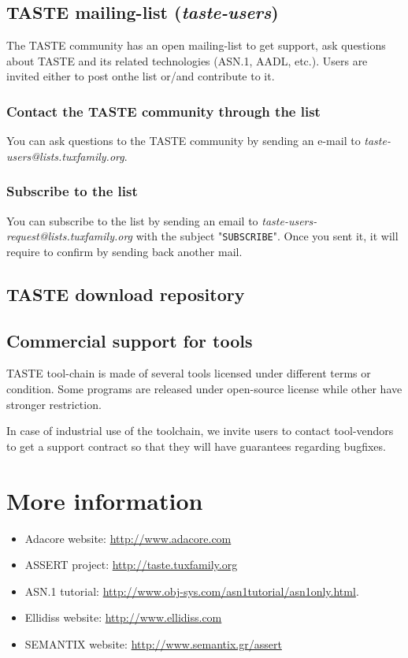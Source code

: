 \documentclass[11pt]{book}
\begin{document}
{   \section{TASTE mailing-list (\textit{taste-users})}
   The TASTE community has an open mailing-list to get support, ask questions
   about TASTE and its related technologies (ASN.1, AADL, etc.). Users are
   invited either to post onthe list or/and contribute to it.

      \subsection{Contact the TASTE community through the list}
      You can ask questions to the TASTE community by sending an e-mail to
      \textit{taste-users@lists.tuxfamily.org}.

      \subsection{Subscribe to the list}
      You can subscribe to the list by sending an email to
      \textit{taste-users-request@lists.tuxfamily.org} with the subject
      "\texttt{SUBSCRIBE}". Once you sent it, it will require to confirm by
      sending back another mail.

   \section{TASTE download repository}

   \section{Commercial support for tools}
   TASTE tool-chain is made of several tools licensed under different terms or
   condition. Some programs are released under open-source license while other
   have stronger restriction.

   In case of industrial use of the toolchain, we invite users to contact
   tool-vendors to get a support contract so that they will have guarantees
   regarding bugfixes.

\appendix

\chapter{More information}
\begin{itemize}
   \item
      Adacore website: \url{http://www.adacore.com}
   \item
      ASSERT project: \url{http://taste.tuxfamily.org}
   \item
      ASN.1 tutorial: \url{http://www.obj-sys.com/asn1tutorial/asn1only.html}.
   \item
      Ellidiss website: \url{http://www.ellidiss.com}
   \item
      SEMANTIX website: \url{http://www.semantix.gr/assert}
\end{itemize}

}
\end{document}
